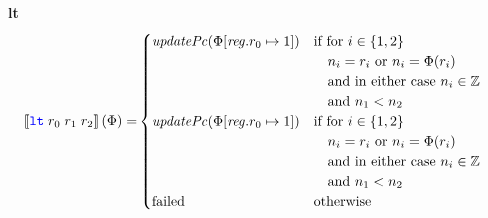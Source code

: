 \documentclass[a4paper]{article}
\newcommand{\sem}[1]{\left\llbracket #1 \right\rrbracket}
\newcommand{\sourcecolor}[1]{\color{blue}}
\newcommand{\src}[1]{{\sourcecolor{} #1}}
\newcommand{\zinstr}[1]{\texttt{#1}}
\newcommand{\threeinstr}[4]{
  \ifthenelse{\equal{#2#3#4}{}}
  {\zinstr{#1}}
  {\zinstr{#1} \; #2 \; #3 \; #4}
}
\newcommand{\slt}[3]{\threeinstr{\src{lt}}{#1}{#2}{#3}}
\newcommand{\ints}{\mathbb{Z}}
\newcommand{\update}[2]{[#1 \mapsto #2]}
\newcommand{\updReg}[2]{\update{\reg.#1}{#2}}
\newcommand{\failed}{\mathrm{failed}}
\newcommand{\var}[1]{\mathit{#1}}
\newcommand{\reg}{\var{reg}}
\newcommand{\plainfun}[2]{
  \ifthenelse{\equal{#2}{}}
  {\mathit{#1}}
  {\mathit{#1}(#2)}
}
\newcommand{\updPcAddr}[1]{\plainfun{updatePc}{#1}}
\begin{document}
\noindent\textbf{lt}\\
\begin{align*}
  \sem{\slt{r_0}{r_1}{r_2}}(\Phi) = &
                                                  \begin{cases}
                                                    \updPcAddr{\Phi\updReg{r_0}{1}} &
                                                    \arraycolsep=0pt
                                                    \begin{array}[t]{l}
                                                      \text{if for $i \in \{1,2\}$}\\
                                                      \quad\text{$n_i = r_i$ or $n_i = \Phi(r_i)$}\\
                                                      \quad\text{and in either case $n_i \in \ints$}\\
                                                      \quad\text{and $n_1 < n_2$}\\        
                                                    \end{array}\\
                                                    \updPcAddr{\Phi\updReg{r_0}{1}} &
                                                    \arraycolsep=0pt
                                                    \begin{array}[t]{l}
                                                      \text{if for $i \in \{1,2\}$}\\
                                                      \quad\text{$n_i = r_i$ or $n_i = \Phi(r_i)$}\\
                                                      \quad\text{and in either case $n_i \in \ints$}\\
                                                      \quad\text{and $n_1 < n_2$}\\        
                                                    \end{array}\\
                                                    \failed & \text{otherwise}
                                                  \end{cases}  
\end{align*}
\end{document}
